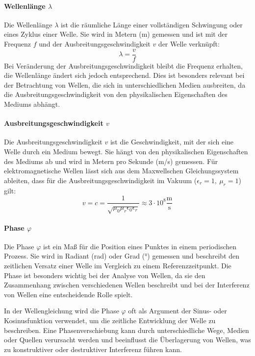 \documentclass[12pt,a4paper,titlepage]{scrartcl}
\numberwithin{equation}{section}
\numberwithin{table}{section}
\numberwithin{figure}{section}
\begin{document}
\paragraph{Wellenlänge $\lambda$}
Die Wellenlänge $\lambda$ ist die räumliche Länge einer vollständigen Schwingung oder eines Zyklus einer Welle. Sie wird in Metern (m) gemessen und ist mit der Frequenz $f$ und der Ausbreitungsgeschwindigkeit $v$ der Welle verknüpft:
\begin{equation}
    \lambda = \frac{v}{f}
\end{equation}
Bei Veränderung der Ausbreitungsgeschwindigkeit bleibt die Frequenz erhalten, die Wellenlänge ändert sich jedoch entsprechend. Dies ist besonders relevant bei der Betrachtung von Wellen, die sich in unterschiedlichen Medien ausbreiten, da die Ausbreitungsgeschwindigkeit von den physikalischen Eigenschaften des Mediums abhängt.

\paragraph{Ausbreitungsgeschwindigkeit $v$}
Die Ausbreitungsgeschwindigkeit $v$ ist die Geschwindigkeit, mit der sich eine Welle durch ein Medium bewegt. Sie hängt von den physikalischen Eigenschaften des Mediums ab und wird in Metern pro Sekunde (m/s) gemessen. Für elektromagnetische Wellen lässt sich aus dem Maxwellschen Gleichungssystem ableiten, dass für die Ausbreitungsgeschwindigkeit im Vakuum ($\epsilon_r = 1{,}\ \mu_r = 1$) gilt:
\begin{equation}
    v = c = \frac{1}{\sqrt{\mu_0 \mu_r \epsilon_0 \epsilon_r}} \approx 3 \cdot 10^8 \frac{\text{m}}{\text{s}}
\end{equation}

\paragraph{Phase $\varphi$}
Die Phase $\varphi$ ist ein Maß für die Position eines Punktes in einem periodischen Prozess. Sie wird in Radiant (rad) oder Grad (°) gemessen und beschreibt den zeitlichen Versatz einer Welle im Vergleich zu einem Referenzzeitpunkt. Die Phase ist besonders wichtig bei der Analyse von Wellen, da sie den Zusammenhang zwischen verschiedenen Wellen beschreibt und bei der Interferenz von Wellen eine entscheidende Rolle spielt.

In der Wellengleichung wird die Phase $\varphi$ oft als Argument der Sinus- oder Kosinusfunktion verwendet, um die zeitliche Entwicklung der Welle zu beschreiben. Eine Phasenverschiebung kann durch unterschiedliche Wege, Medien oder Quellen verursacht werden und beeinflusst die Überlagerung von Wellen, was zu konstruktiver oder destruktiver Interferenz führen kann.
\end{document}
